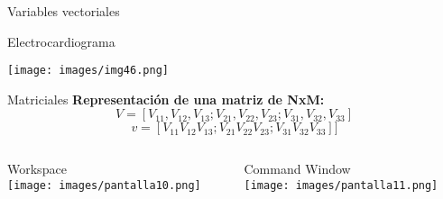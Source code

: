 \documentclass{bredelebeamer}
\begin{document}
\begin{frame}{Variables vectoriales}
\begin{center}
Electrocardiograma
\end{center}
\begin{center}
\texttt{[image: images/img46.png]}
\end{center}
\end{frame}

\begin{frame}{Matriciales}
\textbf{Representación de una matriz de NxM:}
\begin{equation*}
V = [V_{11},V_{12},V_{13} ; V_{21},V_{22},V_{23} ; V_{31},V_{32},V_{33}]
\end{equation*}
\begin{equation*}
v = [V_{11} V_{12} V_{13} ; V_{21} V_{22} V_{23} ; V_{31} V_{32} V_{33}]]
\end{equation*}
\begin{columns}
\begin{column}{0.5\textwidth}
\begin{center}
Workspace\\
\texttt{[image: images/pantalla10.png]}
\end{center}
\end{column}
\begin{column}{0.5\textwidth}
\begin{center}
Command Window\\
\texttt{[image: images/pantalla11.png]}
\end{center}
\end{column}
\end{columns}
\end{frame}
\end{document}
